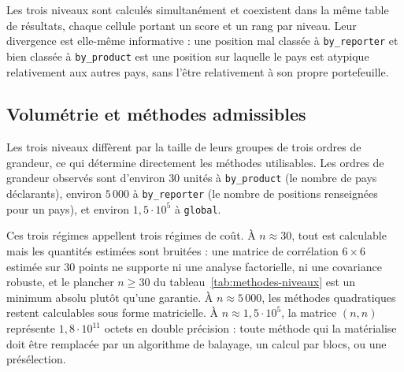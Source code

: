 \documentclass[11pt,a4paper]{article}
\theoremstyle{definition}
\theoremstyle{remark}
\begin{document}
\bigskip

Les trois niveaux sont calculés simultanément et coexistent dans la même table de
résultats, chaque cellule portant un score et un rang par niveau. Leur divergence est
elle-même informative : une position mal classée à \texttt{by\_reporter} et bien classée à
\texttt{by\_product} est une position sur laquelle le pays est atypique relativement aux
autres pays, sans l'être relativement à son propre portefeuille.

\bigskip

\subsection{Volumétrie et méthodes admissibles}
\label{sec:app-volumetrie}

\medskip

Les trois niveaux diffèrent par la taille de leurs groupes de trois ordres de grandeur, ce
qui détermine directement les méthodes utilisables. Les ordres de grandeur observés sont
d'environ $30$ unités à \texttt{by\_product} (le nombre de pays déclarants), environ
$5\,000$ à \texttt{by\_reporter} (le nombre de positions renseignées pour un pays), et
environ $1{,}5 \cdot 10^{5}$ à \texttt{global}.

\medskip

Ces trois régimes appellent trois régimes de coût. À $n \approx 30$, tout est calculable
mais les quantités estimées sont bruitées : une matrice de corrélation $6\times 6$ estimée
sur $30$ points ne supporte ni une analyse factorielle, ni une covariance robuste, et le
plancher $n \ge 30$ du tableau~\ref{tab:methodes-niveaux} est un minimum absolu plutôt
qu'une garantie. À $n \approx 5\,000$, les méthodes quadratiques restent calculables sous
forme matricielle. À $n \approx 1{,}5\cdot 10^{5}$, la matrice $(n,n)$ représente
$1{,}8\cdot 10^{11}$ octets en double précision : toute méthode qui la matérialise doit
être remplacée par un algorithme de balayage, un calcul par blocs, ou une présélection.

\medskip
\end{document}
